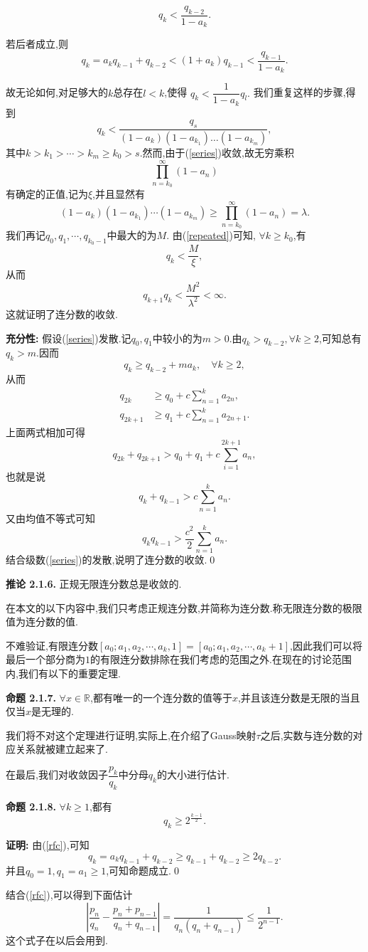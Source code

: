 $$q_k<\frac{q_{k-2}}{1-a_k}.$$\par
若后者成立,则
$$q_k=a_kq_{k-1}+q_{k-2}<(1+a_k)q_{k-1}<\frac{q_{k-1}}{1-a_k}.$$\par
故无论如何,对足够大的$k$总存在$l<k$,使得
$q_k<\dfrac{1}{1-a_k}q_l.$
我们重复这样的步骤,得到
$$q_k<\frac{q_s}{\left(1-a_k\right)\left(1-a_{k_1}\right)\ldots\left(1-a_{k_m}\right)},$$
其中$k>k_1>\cdots>k_m\geqslant k_0>s$.然而,由于(\ref{series})收敛,故无穷乘积
$$\prod_{n=k_0}^{\infty}\left(1-a_n\right)$$
有确定的正值,记为$\xi$,并且显然有
\begin{equation}\label{repeated}
(1-a_k)(1-a_{k_1})\cdots(1-a_{k_m})\geqslant \prod_{n=k_0}^{\infty}(1-a_n)=\lambda.   
\end{equation}
我们再记$q_0,q_1,\cdots,q_{k_0-1}$中最大的为$M$.
由(\ref{repeated})可知, $\forall k\geqslant k_0$,有
$$q_k<\frac{M}{\xi},$$
从而
$$q_{k+1}q_k<\frac{M^2}{\lambda^2}<\infty.$$
这就证明了连分数的收敛.\par
\textbf{充分性: }假设(\ref{series})发散.记$q_0,q_1$中较小的为$m>0$.由$q_k>q_{k-2},\forall k\geqslant2$,可知总有$q_k>m$.因而
$$q_k\geqslant q_{k-2}+ma_k,\quad \forall k\geqslant 2,$$
从而
\begin{align*}
q_{2k} &\geqslant q_0+c\sum_{n=1}^k a_{2n},\\
q_{2k+1} &\geqslant q_1+c\sum_{n=1}^k a_{2n+1}.
\end{align*}
上面两式相加可得
$$q_{2k}+q_{2k+1}>q_{0}+q_{1}+c\sum_{i=1}^{2k+1}a_{n},$$
也就是说
$$q_k+q_{k-1}>c\sum\limits_{n=1}^k a_n.$$
又由均值不等式可知
$$q_{k}q_{k-1}>\frac{c^{2}}{2}\sum_{n=1}^{k}a_{n}.$$
结合级数(\ref{series})的发散,说明了连分数的收敛.\qed
\par
\textbf{推论 2.1.6.  }\textsuperscript{\cite{Khinchin}}
正规无限连分数总是收敛的.
\par
在本文的以下内容中,我们只考虑正规连分数,并简称为连分数.称无限连分数的极限值为连分数的值.\par
不难验证,有限连分数$[a_0;a_1,a_2,\cdots,a_k,1]=[a_0;a_1,a_2,\cdots,a_k+1]$,因此我们可以将最后一个部分商为$1$的有限连分数排除在我们考虑的范围之外.在现在的讨论范围内,我们有以下的重要定理.\par
\textbf{命题 2.1.7.  }\textsuperscript{\cite{Khinchin}}
$\forall x\in \mathbb{R}$,都有唯一的一个连分数的值等于$x$,并且该连分数是无限的当且仅当$x$是无理的.
\par
我们将不对这个定理进行证明,实际上,在介绍了Gauss映射$\tau$之后,实数与连分数的对应关系就被建立起来了.\par
在最后,我们对收敛因子$\dfrac{p_k}{q_k}$中分母$q_k$的大小进行估计.\par
\textbf{命题 2.1.8.  }\textsuperscript{\cite{Khinchin}}
$\forall k\geqslant 1$,都有
$$q_{k}\geqslant2^{\frac{k-1}{2}}.$$
\par
\textbf{证明:  }
由(\ref{rfc}),可知
$$q_k=a_k q_{k-1}+q_{k-2}\geqslant q_{k-1}+q_{k-2}\geqslant2q_{k-2}.$$
并且$q_0=1,q_1=a_1\geqslant 1$,可知命题成立.\qed
\par
结合(\ref{rfc}),可以得到下面估计
\begin{equation}\label{klength}
\left|\frac{p_n}{q_n}-\frac{p_n+p_{n-1}}{q_n+q_{n-1}}\right|=\frac{1}{q_n(q_n+q_{n-1})}\leqslant\frac{1}{2^{n-1}}.
\end{equation}
这个式子在以后会用到.
